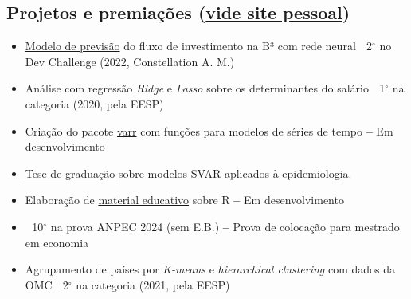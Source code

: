 \documentclass[10pt,letterpaper]{article}
\begin{document}
\subsection*{Projetos e premiações \small(\href{https://ricardo-semiao.github.io/}{\textbf{vide site pessoal}})\normalsize }
\begin{minipage}[t]{.47\textwidth}
    \begin{itemize}
        \item \href{https://github.com/ricardo-semiao/challenge-constdev}{Modelo de previsão} do fluxo de investimento na B³ com rede neural\newline
        \small \faTrophy$\;$ 2$^{\circ}$ no Dev Challenge (2022, Constellation A. M.)\normalsize

        \item Análise com regressão \textit{Ridge} e \textit{Lasso} sobre os determinantes do salário\newline
        \small \faTrophy$\;$ 1$^{\circ}$ na categoria (2020, pela EESP)\normalsize

        \item Criação do pacote \href{https://ricardo-semiao.github.io/varr/}{varr} com funções para modelos de séries de tempo\newline
        \small \textbf{--} Em desenvolvimento \normalsize
    \end{itemize}
\end{minipage}
\hfill
\begin{minipage}[t]{.47\textwidth}
    \begin{itemize}
        \item \href{https://github.com/ricardo-semiao/article-covid-svardiff}{Tese de graduação} sobre modelos SVAR aplicados à epidemiologia.

        \item Elaboração de \href{https://ricardo-semiao.github.io/course-r/}{material educativo} sobre R\newline
        \small \textbf{--} Em desenvolvimento \normalsize

        \item \faTrophy$\;$ 10$^{\circ}$ na prova ANPEC 2024 (sem E.B.)\newline
        \small \textbf{--} Prova de colocação para mestrado em economia\normalsize

        \item Agrupamento de países por \textit{K-means} e \textit{hierarchical clustering} com dados da OMC\newline
        \small \faTrophy$\;$ 2$^{\circ}$ na categoria (2021, pela EESP)\normalsize
    \end{itemize}
\end{minipage}
\end{document}
